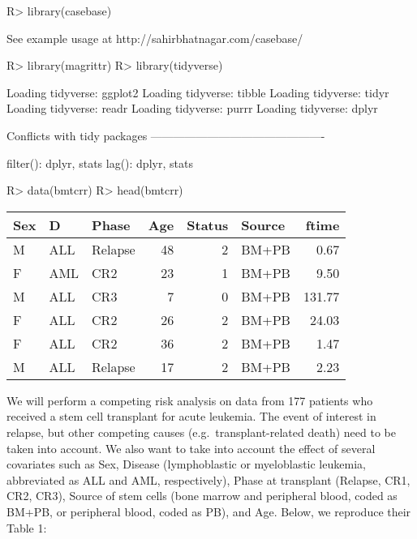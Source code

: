 \documentclass[article]{jss}
\begin{document}
\begin{CodeChunk}

\begin{CodeInput}
R> library(casebase)
\end{CodeInput}

\begin{CodeOutput}
See example usage at http://sahirbhatnagar.com/casebase/
\end{CodeOutput}

\begin{CodeInput}
R> library(magrittr)
R> library(tidyverse)
\end{CodeInput}

\begin{CodeOutput}
Loading tidyverse: ggplot2
Loading tidyverse: tibble
Loading tidyverse: tidyr
Loading tidyverse: readr
Loading tidyverse: purrr
Loading tidyverse: dplyr
\end{CodeOutput}

\begin{CodeOutput}
Conflicts with tidy packages ----------------------------------------------
\end{CodeOutput}

\begin{CodeOutput}
filter(): dplyr, stats
lag():    dplyr, stats
\end{CodeOutput}

\begin{CodeInput}
R> data(bmtcrr)
R> head(bmtcrr) %
\end{CodeInput}

\begin{tabular}{l|l|l|r|r|l|r}
\hline
Sex & D & Phase & Age & Status & Source & ftime\\
\hline
M & ALL & Relapse & 48 & 2 & BM+PB & 0.67\\
\hline
F & AML & CR2 & 23 & 1 & BM+PB & 9.50\\
\hline
M & ALL & CR3 & 7 & 0 & BM+PB & 131.77\\
\hline
F & ALL & CR2 & 26 & 2 & BM+PB & 24.03\\
\hline
F & ALL & CR2 & 36 & 2 & BM+PB & 1.47\\
\hline
M & ALL & Relapse & 17 & 2 & BM+PB & 2.23\\
\hline
\end{tabular}

\end{CodeChunk}

We will perform a competing risk analysis on data from 177 patients who
received a stem cell transplant for acute leukemia. The event of
interest in relapse, but other competing causes (e.g.~transplant-related
death) need to be taken into account. We also want to take into account
the effect of several covariates such as Sex, Disease (lymphoblastic or
myeloblastic leukemia, abbreviated as ALL and AML, respectively), Phase
at transplant (Relapse, CR1, CR2, CR3), Source of stem cells (bone
marrow and peripheral blood, coded as BM+PB, or peripheral blood, coded
as PB), and Age. Below, we reproduce their Table 1:
\end{document}
